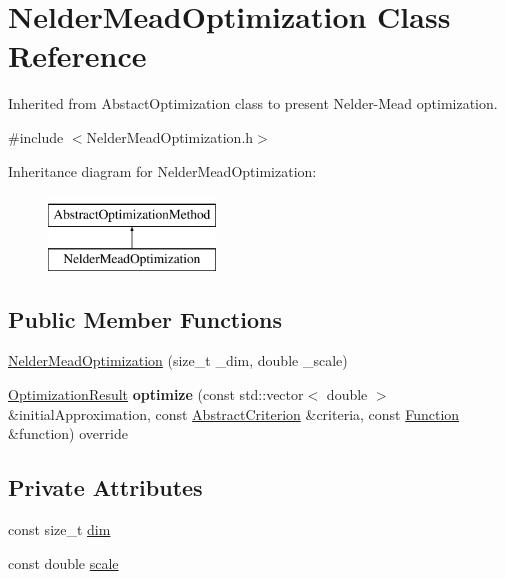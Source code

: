 \hypertarget{class_nelder_mead_optimization}{}\section{Nelder\+Mead\+Optimization Class Reference}
\label{class_nelder_mead_optimization}


Inherited from Abstact\+Optimization class to present Nelder-\/\+Mead optimization.  




{\ttfamily \#include $<$Nelder\+Mead\+Optimization.\+h$>$}

Inheritance diagram for Nelder\+Mead\+Optimization\+:\begin{figure}[H]
\begin{center}
\leavevmode
\includegraphics[height=2.000000cm]{class_nelder_mead_optimization}
\end{center}
\end{figure}
\subsection*{Public Member Functions}
\begin{DoxyCompactItemize}
\item 
\hyperlink{class_nelder_mead_optimization_a6a733eb1628525f18d098823438cbb94}{Nelder\+Mead\+Optimization} (size\+\_\+t \+\_\+dim, double \+\_\+scale)
\item 
\mbox{\label{class_nelder_mead_optimization_a312ae6858ab89b72e77e520335524d37}} 
\hyperlink{class_optimization_result}{Optimization\+Result} {\bfseries optimize} (const std\+::vector$<$ double $>$ \&initial\+Approximation, const \hyperlink{class_abstract_criterion}{Abstract\+Criterion} \&criteria, const \hyperlink{class_function}{Function} \&function) override
\end{DoxyCompactItemize}
\subsection*{Private Attributes}
\begin{DoxyCompactItemize}
\item 
const size\+\_\+t \hyperlink{class_nelder_mead_optimization_acc80e311f32769ddbc923cd7e78718d4}{dim}
\item 
const double \hyperlink{class_nelder_mead_optimization_aadfa64f4a2f44f60755d7d40d912a53f}{scale}
\end{DoxyCompactItemize}
